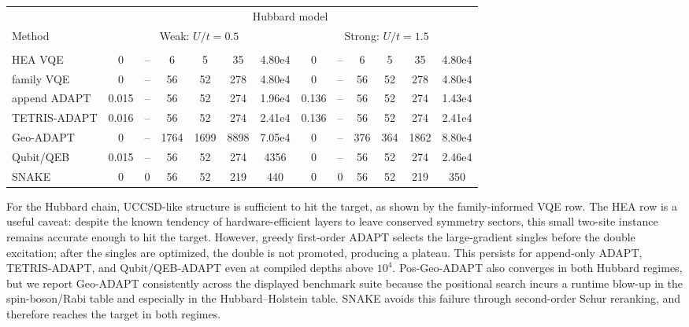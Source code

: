 \documentclass[
  reprint,
  amsmath,
  amssymb,
  aps,
  pra,
  nofootinbib,
  superscriptaddress,
  floatfix
]{revtex4-2}
\newcommand{\metrichead}[1]{\makebox[0.061\textwidth][c]{#1}}
\begin{document}
\begin{widetext}
\begin{minipage}{\textwidth}
\begin{center}
\footnotesize
\setlength{\tabcolsep}{1.15pt}
\renewcommand{\arraystretch}{1.08}
\begin{ruledtabular}
\begin{tabular}{p{}cccccc|cccccc}
& \multicolumn{12}{c}{Hubbard model}\\
\cline{2-13}
Method & \multicolumn{6}{c|}{Weak: $U/t=0.5$} & \multicolumn{6}{c}{Strong: $U/t=1.5$}\\
\cline{2-7}\cline{8-13}
 & \metrichead{$\delta E$} & \metrichead{$1-F$} & \metrichead{$N_{2q}$} & \metrichead{$D_{2q}$} & \metrichead{$D_c$} & \metrichead{$S$} & \metrichead{$\delta E$} & \metrichead{$1-F$} & \metrichead{$N_{2q}$} & \metrichead{$D_{2q}$} & \metrichead{$D_c$} & \metrichead{$S$}\\
\colrule
HEA VQE & 0 & -- & 6 & 5 & 35 & 4.80e4 & 0 & -- & 6 & 5 & 35 & 4.80e4\\
family VQE & 0 & -- & 56 & 52 & 278 & 4.80e4 & 0 & -- & 56 & 52 & 278 & 4.80e4\\
append ADAPT & 0.015 & -- & 56 & 52 & 274 & 1.96e4 & 0.136 & -- & 56 & 52 & 274 & 1.43e4\\
TETRIS-ADAPT & 0.016 & -- & 56 & 52 & 274 & 2.41e4 & 0.136 & -- & 56 & 52 & 274 & 2.41e4\\
Geo-ADAPT & 0 & -- & 1764 & 1699 & 8898 & 7.05e4 & 0 & -- & 376 & 364 & 1862 & 8.80e4\\
Qubit/QEB & 0.015 & -- & 56 & 52 & 274 & 4356 & 0 & -- & 56 & 52 & 274 & 2.46e4\\
SNAKE & 0 & 0 & 56 & 52 & 219 & 440 & 0 & 0 & 56 & 52 & 219 & 350\\
\end{tabular}
\end{ruledtabular}
\end{center}
\end{minipage}
\par\addvspace{1.0ex}
For the Hubbard chain, UCCSD-like structure is sufficient to hit the target, as shown by the family-informed VQE row. The HEA row is a useful caveat: despite the known tendency of hardware-efficient layers to leave conserved symmetry sectors, this small two-site instance remains accurate enough to hit the target. However, greedy first-order ADAPT selects the large-gradient singles before the double excitation; after the singles are optimized, the double is not promoted, producing a plateau. This persists for append-only ADAPT, TETRIS-ADAPT, and Qubit/QEB-ADAPT even at compiled depths above \(10^4\). Pos-Geo-ADAPT also converges in both Hubbard regimes, but we report Geo-ADAPT consistently across the displayed benchmark suite because the positional search incurs a runtime blow-up in the spin-boson/Rabi table and especially in the Hubbard--Holstein table. SNAKE avoids this failure through second-order Schur reranking, and therefore reaches the target in both regimes.


\end{widetext}
\end{document}
